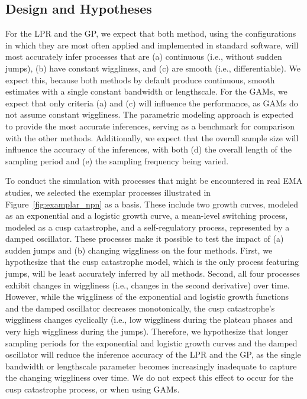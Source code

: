 \documentclass[man, floatsintext]{apa7}
\begin{document}
\subsection{Design and Hypotheses}

For the LPR and the GP, we expect that both method, using the configurations in
which they are most often applied and implemented in standard software, will
most accurately infer processes that are (a) continuous (i.e., without sudden
jumps), (b) have constant wiggliness, and (c) are smooth (i.e.,
differentiable). We expect this, because both methods by default produce
continuous, smooth estimates with a single constant bandwidth or lengthscale.
For the GAMs, we expect that only criteria (a) and (c) will influence the
performance, as GAMs do not assume constant wiggliness. The parametric modeling
approach is expected to provide the most accurate inferences, serving as a
benchmark for comparison with the other methods. Additionally, we expect that
the overall sample size will influence the accuracy of the inferences, with
both (d) the overall length of the sampling period and (e) the sampling
frequency being varied.

To conduct the simulation with processes that might be encountered in real EMA
studies, we selected the exemplar processes illustrated in
Figure~\ref{fig:examplar_npn} as a basis. These include two growth curves,
modeled as an exponential and a logistic growth curve, a mean-level switching
process, modeled as a cusp catastrophe, and a self-regulatory process,
represented by a damped oscillator. These processes make it possible to test
the impact of (a) sudden jumps and (b) changing wiggliness on the four methods.
First, we hypothesize that the cusp catastrophe model, which is the only
process featuring jumps, will be least accurately inferred by all methods.
Second, all four processes exhibit changes in wiggliness (i.e., changes in the
second derivative) over time. However, while the wiggliness of the exponential
and logistic growth functions and the damped oscillator decreases
monotonically, the cusp catastrophe's wiggliness changes cyclically (i.e., low
wiggliness during the plateau phases and very high wiggliness during the
jumps). Therefore, we hypothesize that longer sampling periods for the
exponential and logistic growth curves and the damped oscillator will reduce
the inference accuracy of the LPR and the GP, as the single bandwidth or
lengthscale parameter becomes increasingly inadequate to capture the changing
wiggliness over time. We do not expect this effect to occur for the cusp
catastrophe process, or when using GAMs.
\end{document}

